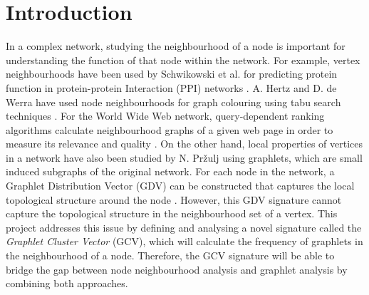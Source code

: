 \chapter{Introduction}
\label{chp:introduction}

In a complex network, studying the neighbourhood of a node is important for understanding the function of that node within the network. For example, vertex neighbourhoods have been used by Schwikowski et al. for predicting protein function in protein-protein Interaction (PPI) networks \cite{schwikowski2000network}. A. Hertz and D. de Werra have used node neighbourhoods for graph colouring using tabu search techniques \cite{hertz1987using}. For the World Wide Web network, query-dependent ranking algorithms calculate neighbourhood graphs of a given web page in order to measure its relevance and quality \cite{henzinger2001hyperlink}. On the other hand, local properties of vertices in a network have also been studied by N. Pr\v{z}ulj using graphlets, which are small induced subgraphs of the original network. For each node in the network, a Graphlet Distribution Vector (GDV) can be constructed that captures the local topological structure around the node \cite{milenkoviae2008uncovering}. However, this GDV 
signature cannot capture the topological structure in the neighbourhood set of a vertex. This project addresses this issue by defining and analysing a novel signature called the \emph{Graphlet Cluster Vector} (GCV), which will calculate the frequency of graphlets in the neighbourhood of a node. Therefore, the GCV signature will be able to bridge the gap between node neighbourhood analysis and graphlet analysis by combining both approaches. 

